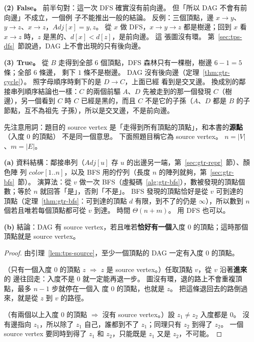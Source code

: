 \textbf{(2) False。} 前半句對：這一次 DFS 確實沒有前向邊。 但「所以 DAG 不會有前向邊」不成立，一個例
子不能推出一般的結論。 反例：三個頂點，邊 $x \to y$、$y \to z$、$x \to z$，$\mathit{Adj}[x] = y, z$。
從 $x$ 做 DFS，$x \to y \to z$ 都是樹邊；回到 $x$ 看 $x \to z$ 時，$z$ 是黑的、$d[x] < d[z]$，是前向邊。 這
張圖沒有環。 第~\ref{sec:tps-dfs}~節說過，DAG 上不會出現的只有後向邊。

\textbf{(3) True。} 從 $B$ 走得到全部 $6$ 個頂點，DFS 森林只有一棵樹，樹邊 $6 - 1 = 5$ 條；全部 $6$ 條邊，
剩下 $1$ 條不是樹邊。 DAG 沒有後向邊（定理~\ref{thm:gtr-cycle}）。 照字母順序時剩下的是 $D \to C$，上面已經
看到是交叉邊。 換成別的鄰接串列順序結論也一樣：$C$ 的兩個前驅 $A$、$D$ 先被走到的那一個發現 $C$（樹
邊），另一個看到 $C$ 時 $C$ 已經是黑的，而且 $C$ 不是它的子孫（$A$、$D$ 都是 $B$ 的子節點，互不為祖先
子孫），所以是交叉邊，不是前向邊。

先注意用詞：題目的 source vertex 是「走得到所有頂點的頂點」，和本書的\textbf{源點}（入度 $0$ 的頂點）
不是同一個意思。 下面照題目稱它為 source vertex。 $n = |V|$、$m = |E|$。

\textbf{(a)} 資料結構：鄰接串列（$\mathit{Adj}[u]$ 存 $u$ 的出邊另一端，第~\ref{sec:gtr-repr}~節）、顏色陣
列 $\mathit{color}[1..n]$，以及 BFS 用的佇列（長度 $n$ 的陣列就夠，第~\ref{sec:gtr-bfs}~節）。 演算法：從
$v$ 做一次 BFS（虛擬碼~\ref{alg:gtr-bfs}），數被發現的頂點個數；等於 $n$ 就回答「是」，否則「不是」。 BFS
發現的頂點恰好是從 $v$ 可到達的頂點（定理~\ref{thm:gtr-bfs}：可到達的頂點 $d$ 有限，到不了的仍是
$\infty$），所以數到 $n$ 個若且唯若每個頂點都可從 $v$ 到達。 時間 $\Theta(n + m)$。 用 DFS 也可以。

\textbf{(b)} 結論：DAG 有 source vertex，若且唯若\textbf{恰好有一個}入度 $0$ 的頂點；這時那個頂點就是
source vertex。

\begin{proof}
由引理~\ref{lem:tps-source}，至少一個頂點的 DAG 一定有入度 $0$ 的頂點。

（只有一個入度 $0$ 的頂點 $z$ $\Rightarrow$ $z$ 是 source vertex。）任取頂點 $v$，從 $v$ 沿著\textbf{進來}的
邊往回走：入度不是 $0$ 就一定能再退一步。 圖沒有環，退的路上不會重複頂點，最多 $n - 1$ 步就停在一個入
度 $0$ 的頂點，也就是 $z$。 把這條退回去的路倒過來，就是從 $z$ 到 $v$ 的路徑。

（有兩個以上入度 $0$ 的頂點 $\Rightarrow$ 沒有 source vertex。）設 $z_1 \ne z_2$ 入度都是 $0$。 沒有邊指向
$z_1$，所以除了 $z_1$ 自己，誰都到不了 $z_1$；同理只有 $z_2$ 到得了 $z_2$。 一個 source vertex 要同時到得了
$z_1$ 和 $z_2$，只能既是 $z_1$ 又是 $z_2$，不可能。
\end{proof}

